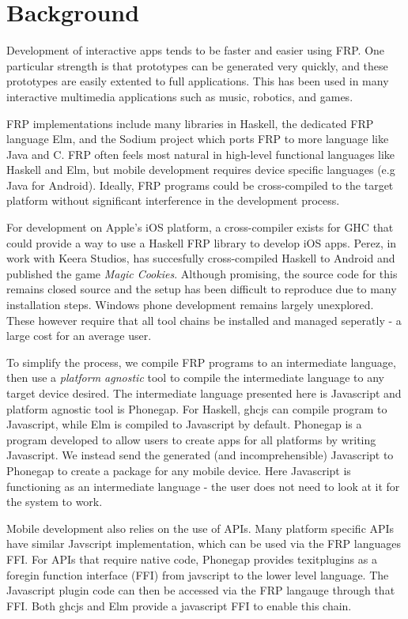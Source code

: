 \documentclass[preprint]{sigplanconf}
\begin{document}

\section{Background}
Development of interactive apps tends to be faster and easier using FRP.
One particular strength is that prototypes can be generated very quickly, and these prototypes are easily extented to full applications.
This has been used in many interactive multimedia applications such as music, robotics, and games\cite{}.

FRP implementations include many libraries in Haskell, the dedicated FRP language Elm, and the Sodium project which ports FRP to more language like Java and C.
FRP often feels most natural in high-level functional languages like Haskell and Elm, but mobile development requires device specific languages (e.g Java for Android).
Ideally, FRP programs could be cross-compiled to the target platform without significant interference in the development process.

For development on Apple's iOS platform, a cross-compiler exists for GHC that could provide a way to use a Haskell FRP library to develop iOS apps.
Perez, in work with Keera Studios, has succesfully cross-compiled Haskell to Android and published the game \textit{Magic Cookies}\cite{}.
Although promising, the source code for this remains closed source and the setup has been difficult to reproduce due to many installation steps.
Windows phone development remains largely unexplored.
These however require that all tool chains be installed and managed seperatly - a large cost for an average user.

To simplify the process, we compile FRP programs to an intermediate language, then use a \textit{platform agnostic} tool to compile the intermediate language to any target device desired.
The intermediate language presented here is Javascript and platform agnostic tool is Phonegap.
For Haskell, ghcjs can compile program to Javascript, while Elm is compiled to Javascript by default.
Phonegap is a program developed to allow users to create apps for all platforms by writing Javascript. 
We instead send the generated (and incomprehensible) Javascript to Phonegap to create a package for any mobile device.
Here Javascript is functioning as an intermediate language - the user does not need to look at it for the system to work.

Mobile development also relies on the use of APIs.
Many platform specific APIs have similar Javscript implementation, which can be used via the FRP languages FFI.
For APIs that require native code, Phonegap provides texit{plugins} as a foregin function interface (FFI) from javscript to the lower level language.
The Javascript plugin code can then be accessed via the FRP langauge through that FFI.
Both ghcjs and Elm provide a javascript FFI to enable this chain. 
\end{document}
